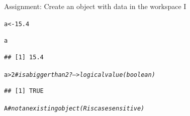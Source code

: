 \documentclass[xcolor=table,       handout,    xcolor=dvipsnames]{beamer}\usepackage[]{graphicx}\usepackage[]{color}
\makeatletter
\newcommand{\hlnum}[1]{\textcolor[rgb]{0,0,0}{#1}}
\newcommand{\hlcom}[1]{\textcolor[rgb]{0,0.392,0}{\textit{#1}}}
\newcommand{\hlopt}[1]{\textcolor[rgb]{0,0,0}{#1}}
\newcommand{\hlstd}[1]{\textcolor[rgb]{0,0,0}{#1}}
\newcommand{\hlkwb}[1]{\textcolor[rgb]{0,0,0}{#1}}
\newenvironment{kframe}{%
 \def\at@end@of@kframe{}%
 \ifinner\ifhmode%
  \def\at@end@of@kframe{\end{minipage}}%
  \begin{minipage}{\columnwidth}%
 \fi\fi%
 \def\FrameCommand##1{\hskip\@totalleftmargin \hskip-\fboxsep
 \colorbox{shadecolor}{##1}\hskip-\fboxsep
     \hskip-\linewidth \hskip-\@totalleftmargin \hskip\columnwidth}%
 \MakeFramed {\advance\hsize-\width
   \@totalleftmargin\z@ \linewidth\hsize
   \@setminipage}}%
 {\par\unskip\endMakeFramed%
 \at@end@of@kframe}
\newenvironment{knitrout}{}{} %
\makeatother
\begin{document}
\begin{frame}[fragile]{Assignment:  Create an object with data in the workspace I}
\begin{knitrout}
\color{fgcolor}\begin{kframe}
\begin{alltt}
\hlstd{a} \hlkwb{<-} \hlnum{15.4}
\end{alltt}
\end{kframe}
\end{knitrout}
\begin{knitrout}
\color{fgcolor}\begin{kframe}
\begin{alltt}
\hlstd{a}
\end{alltt}
\begin{verbatim}
## [1] 15.4
\end{verbatim}
\end{kframe}
\end{knitrout}
\begin{knitrout}
\color{fgcolor}\begin{kframe}
\begin{alltt}
\hlstd{a} \hlopt{>} \hlnum{2} \hlcom{# is a bigger than 2?  --> logical value (boolean)}
\end{alltt}
\begin{verbatim}
## [1] TRUE
\end{verbatim}
\end{kframe}
\end{knitrout}
\begin{knitrout}
\color{fgcolor}\begin{kframe}
\begin{alltt}
\hlstd{A} \hlcom{# not an existing object (R is case sensitive)}
\end{alltt}


{\ttfamily\noindent\bfseries\color{errorcolor}{\#\# Error in eval(expr, envir, enclos): object 'A' not found}}\end{kframe}
\end{knitrout}
\end{frame}

\end{document}
